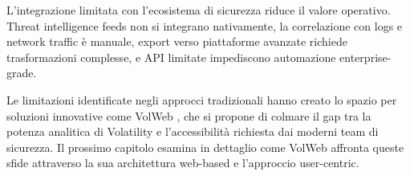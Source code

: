 L'integrazione limitata con l'ecosistema di sicurezza riduce il valore operativo. Threat intelligence feeds non si integrano nativamente, la correlazione con logs e network traffic è manuale, export verso piattaforme avanzate richiede trasformazioni complesse, e API limitate impediscono automazione enterprise-grade.

Le limitazioni identificate negli approcci tradizionali hanno creato lo spazio per soluzioni innovative come VolWeb \cite{volweb2024}, che si propone di colmare il gap tra la potenza analitica di Volatility e l'accessibilità richiesta dai moderni team di sicurezza. Il prossimo capitolo esamina in dettaglio come VolWeb affronta queste sfide attraverso la sua architettura web-based e l'approccio user-centric.